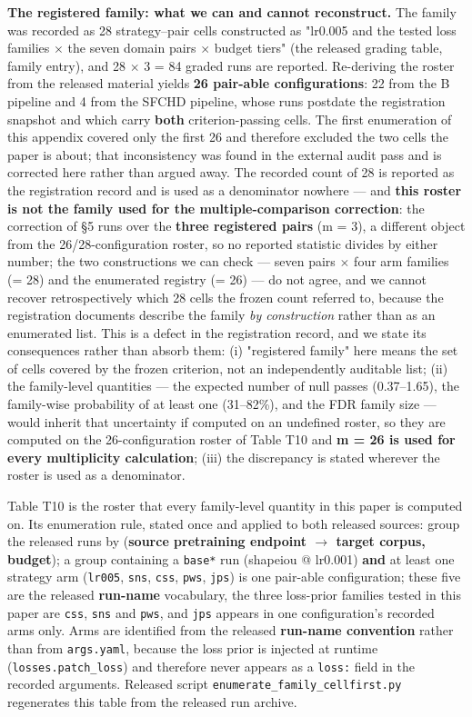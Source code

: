 \documentclass[pdflatex,sn-mathphys-ay]{sn-jnl}
\begin{document}
\textbf{The registered family: what we can and cannot reconstruct.} The family was recorded as 28 strategy--pair cells constructed as "lr0.005 and the tested loss families \ensuremath{\times} the seven domain pairs \ensuremath{\times} budget tiers" (the released grading table, family entry), and 28 \ensuremath{\times} 3 = 84 graded runs are reported. Re-deriving the roster from the released material yields \textbf{26 pair-able configurations}: 22 from the B pipeline and 4 from the SFCHD pipeline, whose runs postdate the registration snapshot and which carry \textbf{both} criterion-passing cells. The first enumeration of this appendix covered only the first 26 and therefore excluded the two cells the paper is about; that inconsistency was found in the external audit pass and is corrected here rather than argued away. The recorded count of 28 is reported as the registration record and is used as a denominator nowhere --- and \textbf{this roster is not the family used for the multiple-comparison correction}: the correction of \S{}5 runs over the \textbf{three registered pairs} (m = 3), a different object from the 26/28-configuration roster, so no reported statistic divides by either number; the two constructions we can check --- seven pairs \ensuremath{\times} four arm families (= 28) and the enumerated registry (= 26) --- do not agree, and we cannot recover retrospectively which 28 cells the frozen count referred to, because the registration documents describe the family \emph{by construction} rather than as an enumerated list. This is a defect in the registration record, and we state its consequences rather than absorb them: (i) "registered family" here means the set of cells covered by the frozen criterion, not an independently auditable list; (ii) the family-level quantities --- the expected number of null passes (0.37--1.65), the family-wise probability of at least one (31--82\%), and the FDR family size --- would inherit that uncertainty if computed on an undefined roster, so they are computed on the 26-configuration roster of Table T10 and \textbf{m = 26 is used for every multiplicity calculation}; (iii) the discrepancy is stated wherever the roster is used as a denominator.

Table T10 is the roster that every family-level quantity in this paper is computed on. Its enumeration rule, stated once and applied to both released sources: group the released runs by (\textbf{source pretraining endpoint \ensuremath{\rightarrow} target corpus, budget}); a group containing a \texttt{base*} run (shapeiou @ lr0.001) \textbf{and} at least one strategy arm (\texttt{lr005}, \texttt{sns}, \texttt{css}, \texttt{pws}, \texttt{jps}) is one pair-able configuration; these five are the released \textbf{run-name} vocabulary, the three loss-prior families tested in this paper are \texttt{css}, \texttt{sns} and \texttt{pws}, and \texttt{jps} appears in one configuration's recorded arms only. Arms are identified from the released \textbf{run-name convention} rather than from \texttt{args.yaml}, because the loss prior is injected at runtime (\texttt{losses.patch\_loss}) and therefore never appears as a \texttt{loss:} field in the recorded arguments. Released script \texttt{enumerate\_family\_cellfirst.py} regenerates this table from the released run archive.
\end{document}
